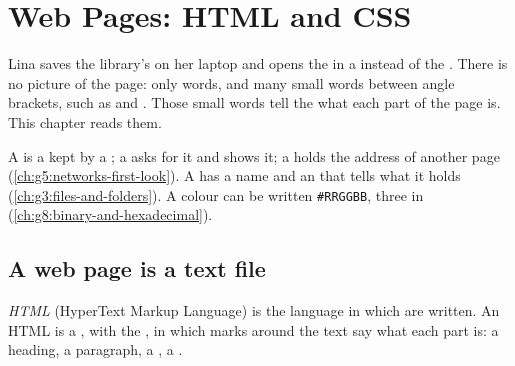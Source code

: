 \chapter{Web Pages: HTML and CSS}\label{ch:g9:html-and-css}

Lina saves the library's  on her laptop and opens the  in a  instead of the . There is no picture of the page: only words,
and many small words between angle brackets, such as  and
. Those small words tell the  what each part of the page
is. This chapter reads them.

\begin{recall}
A  is a  kept by a ; a  asks for it and shows it; a
 holds the address of another page (\cref{ch:g5:networks-first-look}). A
 has a name and an  that tells what it holds
(\cref{ch:g3:files-and-folders}). A colour can be written \texttt{\#RRGGBB},
three  in  (\cref{ch:g8:binary-and-hexadecimal}).
\end{recall}

\section{A web page is a text file}

\begin{definition}[HTML]\label{def:g9:html-and-css:html}
\emph{HTML} (HyperText Markup Language) is the language in which
 are written. An HTML  is a , with the 
, in which marks around the text say what each part is: a
heading, a paragraph, a , a .
\end{definition}


